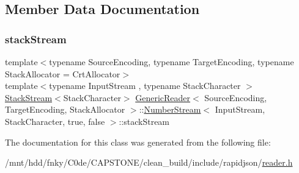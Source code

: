 \subsection{Member Data Documentation}
\mbox{\label{classGenericReader_1_1NumberStream_3_01InputStream_00_01StackCharacter_00_01true_00_01false_01_4_a144461a74c5f310297a8387df9d04d9f}} 
\subsubsection{\texorpdfstring{stack\+Stream}{stackStream}}
{\footnotesize\ttfamily template$<$typename Source\+Encoding, typename Target\+Encoding, typename Stack\+Allocator = Crt\+Allocator$>$ \\
template$<$typename Input\+Stream , typename Stack\+Character $>$ \\
\hyperlink{classGenericReader_1_1StackStream}{Stack\+Stream}$<$Stack\+Character$>$ \hyperlink{classGenericReader}{Generic\+Reader}$<$ Source\+Encoding, Target\+Encoding, Stack\+Allocator $>$\+::\hyperlink{classGenericReader_1_1NumberStream}{Number\+Stream}$<$ Input\+Stream, Stack\+Character, true, false $>$\+::stack\+Stream\hspace{0.3cm}{\ttfamily [private]}}



The documentation for this class was generated from the following file\+:\begin{DoxyCompactItemize}
\item 
/mnt/hdd/fnky/\+C0de/\+C\+A\+P\+S\+T\+O\+N\+E/clean\+\_\+build/include/rapidjson/\hyperlink{reader_8h}{reader.\+h}\end{DoxyCompactItemize}
